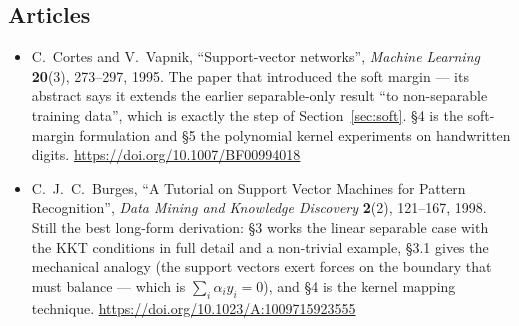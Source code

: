 \documentclass[11pt]{article}
\begin{document}
\subsection*{Articles}

\begin{itemize}[leftmargin=*]
  \item C.\ Cortes and V.\ Vapnik, ``Support-vector networks'',
    \emph{Machine Learning} \textbf{20}(3), 273--297, 1995. The paper that
    introduced the soft margin --- its abstract says it extends the earlier
    separable-only result ``to non-separable training data'', which is exactly
    the step of Section~\ref{sec:soft}. \S4 is the soft-margin formulation and
    \S5 the polynomial kernel experiments on handwritten digits.
    \url{https://doi.org/10.1007/BF00994018}
  \item C.\ J.\ C.\ Burges, ``A Tutorial on Support Vector Machines for
    Pattern Recognition'', \emph{Data Mining and Knowledge Discovery}
    \textbf{2}(2), 121--167, 1998. Still the best long-form derivation: \S3
    works the linear separable case with the KKT conditions in full detail and
    a non-trivial example, \S3.1 gives the mechanical analogy (the support
    vectors exert forces on the boundary that must balance --- which is
    $\sum_i \alpha_i y_i = 0$), and \S4 is the kernel mapping technique.
    \url{https://doi.org/10.1023/A:1009715923555}
\end{itemize}

\notesources{\AMLUnitVISources}
\end{document}
